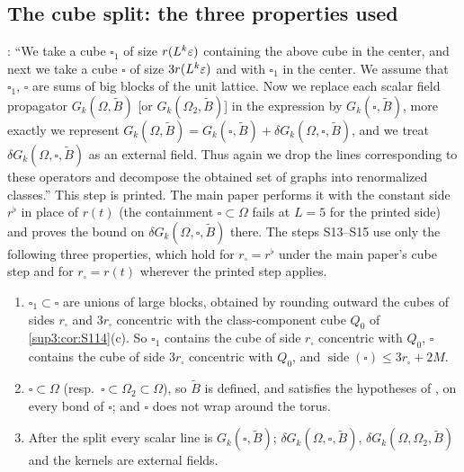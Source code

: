 
\subsection{The cube split: the three properties used}\label{sup3:ssec:S12}

\cite[p.~433]{Ba3}: ``We take a cube $\square_1$ of size $r(L^k\varepsilon)$ containing the above cube in the center, and next we take a cube $\square$ of size $3r(L^k\varepsilon)$ and with $\square_1$ in the center. We assume that $\square_1$, $\square$ are sums of big blocks of the unit lattice. Now we replace each scalar field propagator $G_k(\Omega,\tilde B)$ [or $G_k(\Omega_2,\tilde B)$] in the expression by $G_k(\square,\tilde B)$, more exactly we represent $G_k(\Omega,\tilde B)=G_k(\square,\tilde B)+\delta G_k(\Omega,\square,\tilde B)$, and we treat $\delta G_k(\Omega,\square,\tilde B)$ as an external field. Thus again we drop the lines corresponding to these operators and decompose the obtained set of graphs into renormalized classes.'' This step is printed. The main paper performs it with the constant side $r^\flat$ in place of $r(t)$ (the containment $\square\subset\Omega$ fails at $L=5$ for the printed side) and proves the bound on $\delta G_k(\Omega,\square,\tilde B)$ there. The steps S13--S15 use only the following three properties, which hold for $r_\square=r^\flat$ under the main paper's cube step and for $r_\square=r(t)$ wherever the printed step applies.
\begin{enumerate}[label=\textup{(P-\roman*)},nosep,leftmargin=*]
\item $\square_1\subset\square$ are unions of large blocks, obtained by rounding outward the cubes of sides $r_\square$ and $3r_\square$ concentric with the class-component cube $Q_0$ of \cref{sup3:cor:S114}(c). So $\square_1$ contains the cube of side $r_\square$ concentric with $Q_0$, $\square$ contains the cube of side $3r_\square$ concentric with $Q_0$, and $\operatorname{side}(\square)\le3r_\square+2M$.
\item $\square\subset\Omega$ (resp.\ $\square\subset\Omega_2\subset\Omega$), so $\tilde B$ is defined, and satisfies the hypotheses of \cite[p.~412]{Ba3}, on every bond of $\square$; and $\square$ does not wrap around the torus.
\item After the split every scalar line is $G_k(\square,\tilde B)$; $\delta G_k(\Omega,\square,\tilde B)$, $\delta G_k(\Omega,\Omega_2,\tilde B)$ and the kernels \cite[(1.16)]{Ba3} are external fields.
\end{enumerate}

